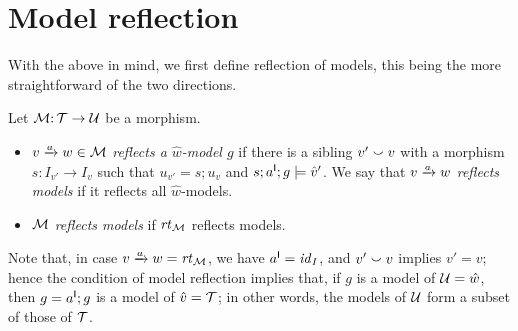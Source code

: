 \section{Model reflection}
\label{sec:reflection}

With the above in mind, we first define reflection of models, this being the more straightforward of the two directions.

\begin{definition}
Let ${\mathcal{M}}{:}\, {\mathcal{T}}\rightarrow{\mathcal{U}}$ be a morphism.
\begin{itemize}[topsep=\itemsep]
\item $\trip vaw\in\cM$ \emph{reflects a $\hat w$-model $g$} if there is a sibling $v'\smallsmile v$ with a morphism $s:I_{v'}\to I_v$ such that $u_{v'}=s;u_v$ and $s;a^{\mathsf I};g\models \hat v'$. We say that $\trip vaw$ \emph{reflects models} if it reflects all $\hat w$-models.

\item ${\mathcal{M}}$ \emph{reflects models} if $\mathit{rt}_{{\mathcal{M}}}$ reflects models.
\end{itemize}
\end{definition}
%
Note that, in case $\trip vaw=\rtof\cM$, we have $a^{\mathsf I}={\mathit{id}}_I$, and $v'\smallsmile v$ implies $v'=v$; hence the condition of model reflection implies that, if $g$ is a model of ${\mathcal{U}}=\hat w$, then $g=a^{\mathsf I};g$ is a model of $\hat v={\mathcal{T}}$; in other words, the models of ${\mathcal{U}}$ form a subset of those of ${\mathcal{T}}$.

